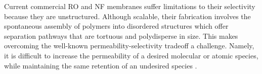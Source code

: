 \documentclass[journal=jpcbfk,manuscript=article]{achemso}
\begin{document}



  Current commercial RO and NF membranes suffer limitations to their selectivity
  because they are unstructured. Although scalable, their fabrication involves the 
  spontaneous assembly of polymers into disordered structures which offer separation 
  pathways that are tortuous and polydisperse in size. This makes overcoming the well-known 
  permeability-selectivity tradeoff a challenge. Namely, it is difficult to increase
  the permeability of a desired molecular or atomic species, while maintaining the 
  same retention of an undesired species \cite{werber_materials_2016}. 

\end{document}
